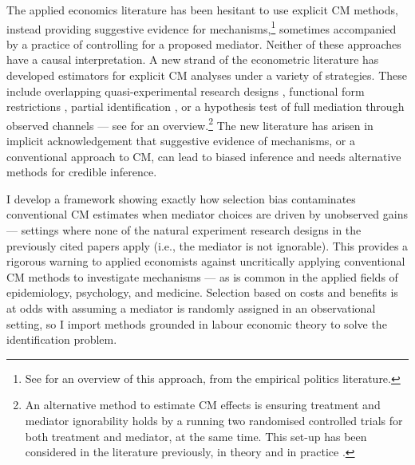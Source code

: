 The applied economics literature has been hesitant to use explicit CM methods, instead providing suggestive evidence for mechanisms,\footnote{
    See \cite{blackwell2024assumption} for an overview of this approach, from the empirical politics literature.
} sometimes accompanied by a practice of controlling for a proposed mediator.
Neither of these approaches have a causal interpretation.
A new strand of the econometric literature has developed estimators for explicit CM analyses under a variety of strategies.
These include overlapping quasi-experimental research designs \citep{deuchert2019direct,frolich2017direct}, functional form restrictions \citep{heckman2015econometric,heckman2013understanding}, partial identification \citep{flores2009identification}, or a hypothesis test of full mediation through observed channels \citep{kwon2024testing} --- see \cite{huber2019review} for an overview.\footnote{
    An alternative method to estimate CM effects is ensuring treatment and mediator ignorability holds by a running two randomised controlled trials for both treatment and mediator, at the same time.
    This set-up has been considered in the literature previously, in theory \citep{imai2013experimental} and in practice \citep{ludwig2011mechanism}.
}
The new literature has arisen in implicit acknowledgement that suggestive evidence of mechanisms, or a conventional approach to CM, can lead to biased inference and needs alternative methods for credible inference.

I develop a framework showing exactly how selection bias contaminates conventional CM estimates when mediator choices are driven by unobserved gains --- settings where none of the natural experiment research designs in the previously cited papers apply (i.e., the mediator is not ignorable).
This provides a rigorous warning to applied economists against uncritically applying conventional CM methods to investigate mechanisms --- as is common in the applied fields of epidemiology, psychology, and medicine.
Selection based on costs and benefits is at odds with assuming a mediator is randomly assigned in an observational setting, so I import methods grounded in labour economic theory to solve the identification problem.

